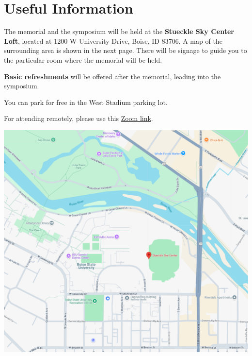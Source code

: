 \documentclass[
	openany, %
	parskip=full, %
	12pt, %
	letterpaper, %
]{conferencebooklet} %
\begin{document}

\chapter{Useful Information}

The memorial and the symposium will be held at the \textbf{Stueckle Sky Center
Loft}, located at 1200 W University Drive, Boise, ID 83706. A map of the
surrounding area is shown in the next page. There will be signage to guide you 
to the particular room where the memorial will be held.

\textbf{Basic refreshments} will be offered after the memorial, leading into the
symposium.

You can park for free in the West Stadium parking lot.

For attending remotely, please use this 
\href{https://www.google.com/url?q=https://boisestate.zoom.us/j/92041896142?pwd%3Dkex70eLC6tKIcjuQ7cW3qPArYgCAMU.1%26jst%3D2&sa=D&source=calendar&ust=1746902820965215&usg=AOvVaw011wx_ahCLtKy9bmFTbUvG}{Zoom link}.

\newpage

\includegraphics[width=\linewidth]{images/stueckle_map}





~

\end{document}
